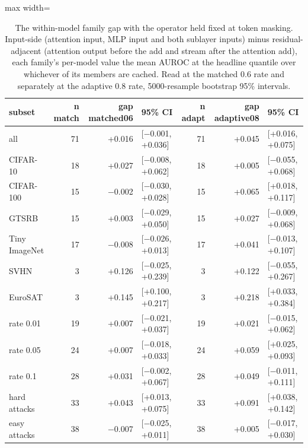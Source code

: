 \begin{table}[htbp]
\centering
\small
\caption{The within-model family gap with the operator held fixed at token masking. Input-side (attention input, MLP input and both sublayer inputs) minus residual-adjacent (attention output before the add and stream after the attention add), each family's per-model value the mean AUROC at the headline quantile over whichever of its members are cached. Read at the matched 0.6 rate and separately at the adaptive 0.8 rate, 5000-resample bootstrap 95\% intervals.}
\label{tab:family-split}
\begin{adjustbox}{max width=\linewidth}
\begin{tabular}{lrrlrrl}
\toprule
subset & n match & gap matched06 & 95\% CI & n adapt & gap adaptive08 & 95\% CI \\
\midrule
all & 71 & +0.016 & [$-$0.001, +0.036] & 71 & +0.045 & [+0.016, +0.075] \\
CIFAR-10 & 18 & +0.027 & [$-$0.008, +0.062] & 18 & +0.005 & [$-$0.055, +0.068] \\
CIFAR-100 & 15 & $-$0.002 & [$-$0.030, +0.028] & 15 & +0.065 & [+0.018, +0.117] \\
GTSRB & 15 & +0.003 & [$-$0.029, +0.050] & 15 & +0.027 & [$-$0.009, +0.068] \\
Tiny ImageNet & 17 & $-$0.008 & [$-$0.026, +0.013] & 17 & +0.041 & [$-$0.013, +0.107] \\
SVHN & 3 & +0.126 & [$-$0.025, +0.239] & 3 & +0.122 & [$-$0.055, +0.267] \\
EuroSAT & 3 & +0.145 & [+0.100, +0.217] & 3 & +0.218 & [+0.033, +0.384] \\
rate 0.01 & 19 & +0.007 & [$-$0.021, +0.037] & 19 & +0.021 & [$-$0.015, +0.062] \\
rate 0.05 & 24 & +0.007 & [$-$0.018, +0.033] & 24 & +0.059 & [+0.025, +0.093] \\
rate 0.1 & 28 & +0.031 & [$-$0.002, +0.067] & 28 & +0.049 & [$-$0.011, +0.111] \\
hard attacks & 33 & +0.043 & [+0.013, +0.075] & 33 & +0.091 & [+0.038, +0.142] \\
easy attacks & 38 & $-$0.007 & [$-$0.025, +0.011] & 38 & +0.005 & [$-$0.017, +0.030] \\
\bottomrule
\end{tabular}
\end{adjustbox}
\end{table}
